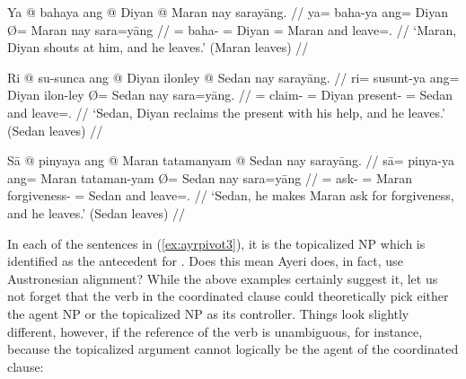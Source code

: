 \a\label{ex:ayrpivot3_loc}\begingl
	\gla Ya @ bahaya ang @ Diyan {} @ Maran nay sarayāng. //
	\glb ya= baha-ya ang= Diyan Ø= Maran nay sara=yāng //
	\glc \LocT{}= baha-\TsgM{} \Aarg{}= Diyan \Top{}= Maran and 
		leave=\TsgM{}.\Aarg{} //
	\glft `Maran, Diyan shouts at him, and he leaves.' (Maran leaves) //
\endgl

\a\label{ex:ayrpivot3_ins}\begingl
	\gla Ri @ su-sunca ang @ Diyan ilonley {} @ Sedan nay sarayāng. //
	\glb ri= su\til{}sunt-ya ang= Diyan ilon-ley Ø= Sedan nay sara=yāng. //
	\glc \InsT{}= \Iter{}\til{}claim-\TsgM{} \Aarg{}= Diyan present-\PargI{}
		\Top{}= Sedan and leave=\TsgM{}.\Aarg{} //
	\glft `Sedan, Diyan reclaims the present with his help, and he leaves.'
		(Sedan leaves) //
\endgl

\a\label{ex:ayrpivot3_cau}\begingl
	\gla Sā @ pinyaya ang @ Maran tatamanyam {} @ Sedan nay sarayāng. //
	\glb sā= pinya-ya ang= Maran tataman-yam Ø= Sedan nay sara=yāng //
	\glc \CauT{}= ask-\TsgM{} \Aarg{}= Maran forgiveness-\Dat{} \Top{}= Sedan
		and leave=\TsgM{}.\Aarg{} //
	\glft `Sedan, he makes Maran ask for forgiveness, and he leaves.' (Sedan
		leaves) //
\endgl

\xe

In each of the sentences in (\ref{ex:ayrpivot3}), it is the topicalized NP
which is identified as the antecedent for .
Does this mean Ayeri does, in fact, use Austronesian alignment? While the above
examples certainly suggest it, let us not forget that the verb in the
coordinated clause could theoretically pick either the agent NP or the
topicalized NP as its controller. Things look slightly different, however, if
the reference of the verb is unambiguous, for instance, because the topicalized
argument cannot logically be the agent of the coordinated clause:

